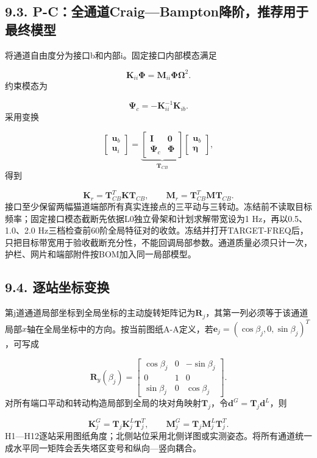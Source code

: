 \documentclass[UTF8,a4paper,11pt,fontset=none]{ctexart}
\begin{document}
\subsection*{9.3. P-C：全通道Craig—Bampton降阶，推荐用于最终模型}
将通道自由度分为接口b和内部i。固定接口内部模态满足\par
\[
\mathbf K_{ii}\boldsymbol\Phi
=
\mathbf M_{ii}\boldsymbol\Phi\boldsymbol\Omega^2.
\]
约束模态为\par
\[
\boldsymbol\Psi_c=-\mathbf K_{ii}^{-1}\mathbf K_{ib}.
\]
采用变换\par
\[
\begin{bmatrix}
\mathbf u_b\\
\mathbf u_i
\end{bmatrix}
=
\underbrace{
\begin{bmatrix}
\mathbf I&\mathbf0\\
\boldsymbol\Psi_c&\boldsymbol\Phi
\end{bmatrix}}_{\mathbf T_{CB}}
\begin{bmatrix}
\mathbf u_b\\
\boldsymbol\eta
\end{bmatrix},
\]
得到\par
\[
\mathbf K_r=\mathbf T_{CB}^T\mathbf K\mathbf T_{CB},
\qquad
\mathbf M_r=\mathbf T_{CB}^T\mathbf M\mathbf T_{CB}.
\]
接口至少保留两幅猫道端部所有真实连接点的三平动与三转动。冻结前不读取目标频率；固定接口模态截断先依据L0独立骨架和计划求解带宽设为1 Hz，再以0.5、1.0、2.0 Hz三档检查前60阶全局特征对的收敛。冻结并打开TARGET-FREQ后，只把目标带宽用于验收截断充分性，不能回调局部参数。通道质量必须只计一次，护栏、网片和端部附件按BOM加入同一局部模型。\par
{}
\subsection*{9.4. 逐站坐标变换}
第j道通道局部坐标到全局坐标的主动旋转矩阵记为\(\mathbf R_j\)\allowbreak{}，其第一列必须等于该通道局部\(x\)\allowbreak{}轴在全局坐标中的方向。按当前图纸A-A定义，若\(\mathbf e_j=(\cos\beta_j,\allowbreak 0,\allowbreak \sin\beta_j)^T\)\allowbreak{}，可写成\par
\[
\mathbf R_y(\beta_j)=
\begin{bmatrix}
\cos\beta_j&0&-\sin\beta_j\\
0&1&0\\
\sin\beta_j&0&\cos\beta_j
\end{bmatrix}.
\]
对所有端口平动和转动构造局部到全局的块对角映射\(\mathbf T_j\)\allowbreak{}，令\(\mathbf d^G=\mathbf T_j\mathbf d^L\)\allowbreak{}，则\par
\[
\mathbf K_j^{G}=\mathbf T_j\mathbf K_j^{L}\mathbf T_j^T,
\qquad
\mathbf M_j^{G}=\mathbf T_j\mathbf M_j^{L}\mathbf T_j^T.
\]
H1—H12逐站采用图纸角度；北侧站位采用北侧详图或实测姿态。将所有通道统一成水平同一矩阵会丢失塔区变号和纵向—竖向耦合。\par
{}
\end{document}
